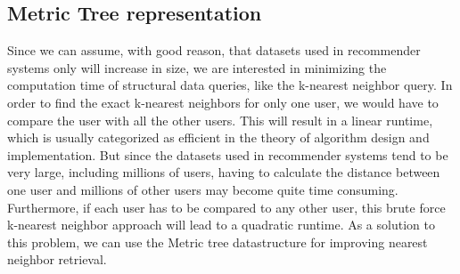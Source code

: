 \subsection{Metric Tree representation}
  Since we can assume, with good reason, that datasets used in recommender systems only will increase in size, we are interested in minimizing the computation time of structural data queries, like the k-nearest neighbor query. In order to find the exact k-nearest neighbors for only one user, we would have to compare the user with all the other users. This will result in a linear runtime, which is usually categorized as efficient in the theory of algorithm design and implementation. But since the datasets used in recommender systems tend to be very large, including millions of users, having to calculate the distance between one user and millions of other users may become quite time consuming. Furthermore, if each user has to be compared to any other user, this brute force k-nearest neighbor approach will lead to a quadratic runtime. As a solution to this problem, we can use the Metric tree datastructure for improving nearest neighbor retrieval.
